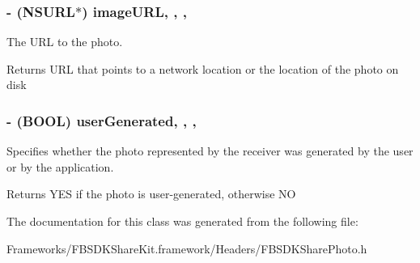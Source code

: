 \subsubsection[{image\+U\+R\+L}]{\setlength{\rightskip}{0pt plus 5cm}-\/ (N\+S\+U\+R\+L$\ast$) image\+U\+R\+L\hspace{0.3cm}{\ttfamily [read]}, {\ttfamily [write]}, {\ttfamily [nonatomic]}, {\ttfamily [copy]}}\label{interface_f_b_s_d_k_share_photo_a499fdf232b43b9222e9db5f320bda63d}
The U\+R\+L to the photo. \begin{DoxyReturn}{Returns}
U\+R\+L that points to a network location or the location of the photo on disk 
\end{DoxyReturn}
\hypertarget{interface_f_b_s_d_k_share_photo_aaa348d2490f0f01361054cf06af7fc4a}{}
\subsubsection[{user\+Generated}]{\setlength{\rightskip}{0pt plus 5cm}-\/ (B\+O\+O\+L) user\+Generated\hspace{0.3cm}{\ttfamily [read]}, {\ttfamily [write]}, {\ttfamily [nonatomic]}, {\ttfamily [assign]}}\label{interface_f_b_s_d_k_share_photo_aaa348d2490f0f01361054cf06af7fc4a}
Specifies whether the photo represented by the receiver was generated by the user or by the application. \begin{DoxyReturn}{Returns}
Y\+E\+S if the photo is user-\/generated, otherwise N\+O 
\end{DoxyReturn}


The documentation for this class was generated from the following file\+:\begin{DoxyCompactItemize}
\item 
Frameworks/\+F\+B\+S\+D\+K\+Share\+Kit.\+framework/\+Headers/F\+B\+S\+D\+K\+Share\+Photo.\+h\end{DoxyCompactItemize}
